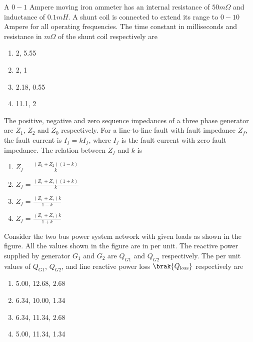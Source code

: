 \item A $0-1$ Ampere moving iron ammeter has an internal resistance of $50 m\Omega$ and inductance of $0.1 mH$. A shunt coil is connected to extend its range to $0-10$ Ampere for all operating frequencies. The time constant in milliseconds and resistance in $m\Omega$ of the shunt coil respectively are
\begin{enumerate}
      \item 2, 5.55
      \item 2, 1
      \item 2.18, 0.55
      \item 11.1, 2
  \end{enumerate}
  \item The positive, negative and zero sequence impedances of a three phase generator are $Z_1$, $Z_2$ and $Z_0$ respectively. For a line-to-line fault with fault impedance $Z_f$, the fault current is $I_f = k I_f$, where $I_f$ is the fault current with zero fault impedance. The relation between $Z_f$ and $k$ is
\begin{enumerate}
    \item $Z_f = \frac{(Z_1 + Z_2)(1 - k)}{k}$
    \item $Z_f = \frac{(Z_1 + Z_2)(1 + k)}{k}$
    \item $Z_f = \frac{(Z_1 + Z_2) k}{1 - k}$
    \item $Z_f = \frac{(Z_1 + Z_2) k}{1 + k}$
\end{enumerate}
\item Consider the two bus power system network with given loads as shown in the figure. All the values shown in the figure are in per unit. The reactive power supplied by generator $G_1$ and $G_2$ are $Q_{G1}$ and $Q_{G2}$ respectively. The per unit values of $Q_{G1}$, $Q_{G2}$, and line reactive power loss $\brak{Q_{\text{loss}}}$ respectively are
 \begin{figure}[!ht]
    \centering
    \label{fig:power system network}
    \end{figure}
\begin{enumerate}
    \item 5.00, 12.68, 2.68
    \item 6.34, 10.00, 1.34
    \item 6.34, 11.34, 2.68
    \item 5.00, 11.34, 1.34
\end{enumerate}

